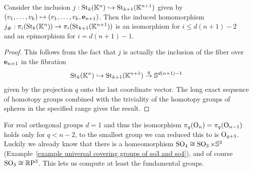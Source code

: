 \begin{cor}
    Consider the inclusion $j:\St_k(\bbK^n)\hookrightarrow \St_{k+1}(\bbK^{n+1})$ given by $(v_1,\ldots,v_k)\mapsto (v_1,\ldots,v_k,\bf{e}_{n+1})$.
    Then the induced homomorphism $j_\#:\pi_i(\St_k(\bbK^n))\to \pi_i(\St_{k+1}(\bbK^{n+1}))$ is an isomorphism for $i\leq d(n+1)-2$ and an epimorphism for $i=d(n+1)-1$.
\end{cor}
\begin{proof}
    This follows from the fact that $j$ is actually the inclusion of the fiber over $\bf{e}_{n+1}$ in the fibration
    \[\St_k(\bbK^n)\hookrightarrow \St_{k+1}(\bbK^{n+1})\overset{q}{\to} \bbS^{d(n+1)-1}\]
    given by the projection $q$ onto the last coordinate vector. The long exact sequence of homotopy groups combined with the triviality of the homotopy groups of spheres in the specified range gives the result.
\end{proof}

For real orthogonal groups $d=1$ and thus the isomorphism $\pi_q(\Or_n)=\pi_q(\Or_{n-1})$ holds only for $q<n-2$, to the smallest group we can reduced this to is $\Or_{q+3}$. Luckily we already know that there is a homeomorphism $\SO_4\cong \SO_3\times \bbS^3$ (Example~\ref{example universal covering groups of so3 and so4}), and of course $\SO_3\cong \RP^3$. This lets us compute at least the fundamental groups.

